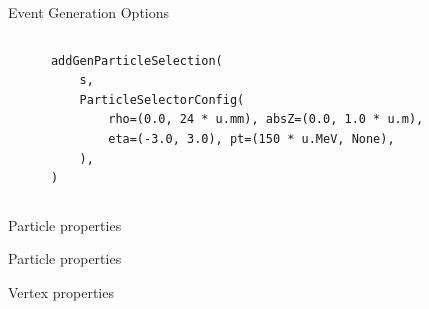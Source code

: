 \documentclass[lualatex,aspectratio=169,t,13pt,dvipsnames]{beamer}
\begin{document}
\begin{frame}[fragile]{Event Generation Options}
\begin{columns}[T]
\begin{onlyenv}
\begin{verbatim}
      addGenParticleSelection(
          s,
          ParticleSelectorConfig(
              rho=(0.0, 24 * u.mm), absZ=(0.0, 1.0 * u.m),
              eta=(-3.0, 3.0), pt=(150 * u.MeV, None),
          ),
      )
    \end{verbatim}
    \end{onlyenv}




  \end{columns}
\end{frame}

\begin{frame}{Particle properties}
  \centering
  \resizebox{!}{\textheight-4em}{}
\end{frame}

\begin{frame}{Particle properties}
  \centering
  \resizebox{!}{\textheight-4em}{}
\end{frame}


\begin{frame}{Vertex properties}
  \centering
  \resizebox{0.5\textwidth}{!}{}%
  \resizebox{0.5\textwidth}{!}{}
\end{frame}
\end{document}
